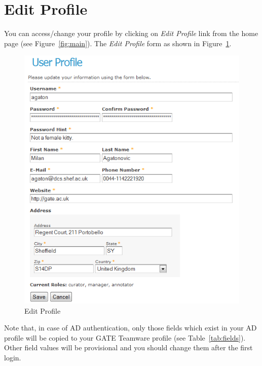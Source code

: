 \section{Edit Profile}
You can access/change your profile by clicking on \emph{Edit Profile} link from
the home page (see Figure~\ref{fig:main}). The
\emph{Edit Profile} form as shown in Figure~\ref{fig:editprofile}.
\begin{figure}[ht!]
\centering
\includegraphics[scale=0.5]{editprofile}
\caption{Edit Profile}
\label{fig:editprofile}
\end{figure}

Note that, in case of AD authentication, only those fields which exist in your
AD profile will be copied to your GATE Teamware profile (see Table~\ref{tab:fields}). Other field values
will be provisional and you should change them after the first login.

